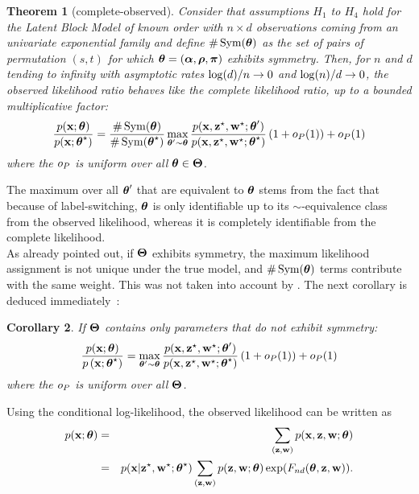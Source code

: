 \documentclass[]{imsart}
\newcommand{\1}{\mathds{1}}
\numberwithin{equation}{section}
\theoremstyle{plain}
\newtheorem{thm}{Theorem}[section]
\newtheorem{corollaire}[thm]{Corollary}
\theoremstyle{remark}
\begin{document}
\begin{thm}[complete-observed]
  \label{thm:observed-akin-to-complete-general}
  Consider that assumptions $H_1$ to $H_4$ hold for the Latent Block Model of known order with $n\times d$ observations coming from an univariate exponential family  and define  $\# \operatorname{Sym}(\boldsymbol{\theta})$ as the set of pairs of permutation $(s,t)$ for which $\boldsymbol{\theta}=(\boldsymbol{\alpha},\boldsymbol{\rho},\boldsymbol{\pi})$ exhibits symmetry. Then, for $n$ and $d$ tending to infinity with asymptotic rates  $\log (d)/n\rightarrow 0$ and $\log(n)/d\rightarrow 0$, the observed likelihood ratio behaves like the complete likelihood ratio, up to a bounded multiplicative factor:
  \begin{equation*}
    \frac{\prob(\bx; \btheta)}{\prob(\bx; \bthetas)} = \frac{\# \Symmetric(\btheta)}{\# \Symmetric(\bthetas)} \max_{\btheta' \sim \btheta} \frac{\prob(\bx, \bzs, \bws; \btheta')}{\prob(\bx, \bzs, \bws; \bthetas)}\left(1 + \smallO_P(1)\right) + \smallO_P(1)
  \end{equation*}
  where the $o_P$ is uniform over all $\boldsymbol{\theta} \in \boldsymbol{\Theta}$.
\end{thm}
The maximum over all $\boldsymbol{\theta}'$ that are equivalent to $\boldsymbol{\theta}$ stems from the fact that because of label-switching, $\boldsymbol{\theta}$ is only identifiable up to its $\sim$-equivalence class from the observed likelihood, whereas it is completely identifiable from the complete likelihood.\\
As already pointed out, if $\boldsymbol{\Theta}$ exhibits symmetry, the maximum likelihood assignment is not unique under the true model, and $\# \operatorname{Sym}(\boldsymbol{\theta})$ terms contribute with the same weight. This was not taken into account by \cite{bickel2013asymptotic}.
The next corollary is deduced immediately~:
\begin{corollaire}
  \label{cor:observed-akin-to-complete-simple-case}
  If $\boldsymbol{\Theta}$ contains only parameters that do not exhibit symmetry:
  \begin{equation*}
    \frac{\prob(\bx; \btheta)}{\prob\left(\bx; \btheta^{\vrai}\right)} = \max_{\btheta' \sim \btheta} \frac{\prob(\bx, \bzs, \bws; \btheta')}{\prob(\bx, \bzs, \bws; \bthetas)}\left(1 + \smallO_P(1)\right) + \smallO_P(1)
  \end{equation*}
where the $o_P$ is uniform over all $\boldsymbol{\Theta}$.
\end{corollaire}


Using the conditional log-likelihood, the observed likelihood can be written as
\begin{eqnarray}
\nonumber
\prob(\bx; \btheta) &=&
  \sum_{ (\bz, \bw)} \prob(\bx, \bz, \bw; \btheta) \\
%
&=&\prob(\bx| \bzs, \bws; \bthetas)
\sum_{(\bz, \bw)}   \prob(\bz, \bw; \btheta) \exp(\Fnd(\btheta, \bz, \bw) ).
\end{eqnarray} 
\end{document}
